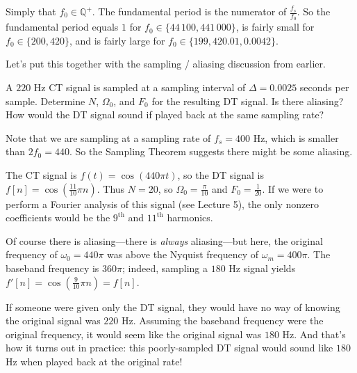 \begin{solution}
    Simply that $f_0 \in \mathbb{Q}^+$.
    The fundamental period is the numerator of $\frac{f_s}{f_0}$.
    So the fundamental period equals $1$ for
    $f_0 \in \{44 \, 100, 441 \, 000\}$,
    is fairly small for $f_0 \in \{200, 420\}$,
    and is fairly large for $f_0 \in \{199, 420.01, 0.0042\}$.
\end{solution}

Let's put this together with the sampling / aliasing discussion from earlier.

\begin{problem}
    A $220$ Hz CT signal is sampled at a sampling interval of $\Delta = 0.0025$ seconds per sample.
    Determine $N$, $\Omega_0$, and $F_0$ for the resulting DT signal.
    Is there aliasing?  How would the DT signal sound if played back at the same sampling rate?
\end{problem}

\begin{solution}
    Note that we are sampling at a sampling rate of $f_s = 400$ Hz, which is smaller than $2f_0 = 440$.
    So the Sampling Theorem suggests there might be some aliasing.
    
    The CT signal is $f(t) = \cos(440\pi t)$, so the DT signal is
    $f[n] = \cos\left(\frac{11}{10}\pi n\right)$.  Thus $N = 20$,
    so $\Omega_0 = \frac{\pi}{10}$ and $F_0 = \frac{1}{20}$.
    If we were to perform a Fourier analysis of this signal (see Lecture 5),
    the only nonzero coefficients would be the $9^{\text{th}}$ and $11^{\text{th}}$ harmonics.

    Of course there is aliasing---there is \emph{always} aliasing---but here,
    the original frequency of $\omega_0 = 440\pi$ was above the Nyquist frequency
    of $\omega_m = 400\pi$.  The baseband frequency is $360\pi$;
    indeed, sampling a $180$ Hz signal yields $f'[n] = \cos\left(\frac{9}{10}\pi n\right) = f[n]$.

    If someone were given only the DT signal, they would have no way of knowing
    the original signal was $220$ Hz.  Assuming the baseband frequency were the original frequency,
    it would seem like the original signal was $180$ Hz.
    And that's how it turns out in practice: this poorly-sampled
    DT signal would sound like $180$ Hz when played back at the original rate!
\end{solution}

